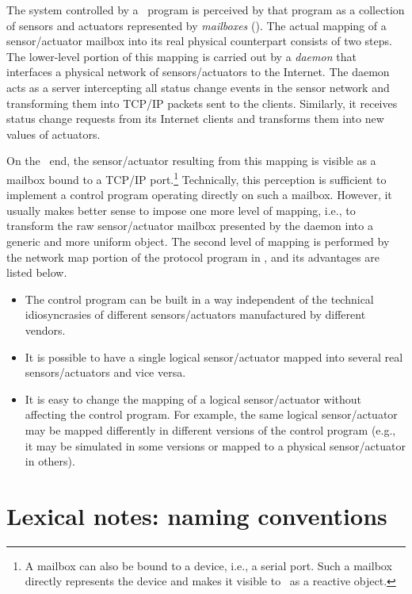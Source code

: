 The system controlled by a \smurph\ program is perceived by that program
as a collection of sensors and actuators represented by
{\em mailboxes\/} ().
The actual mapping of a sensor/actuator mailbox into its real physical
counterpart consists of two steps.
The lower-level portion of this mapping is carried out by a {\em daemon\/} that
interfaces a physical network of sensors/actuators to the Internet.
The daemon acts as a server
intercepting all status change events in the sensor network and transforming
them into TCP/IP packets sent to the clients.
Similarly, it receives status change requests from its Internet
clients and transforms them into new values of actuators.

On the \smurph\ end, the sensor/actuator resulting from this mapping is
visible as a mailbox bound to a TCP/IP
port.\footnote{A mailbox can also be bound to a device, i.e., a serial
port.
Such a mailbox directly represents the device and makes it visible
to \smurph\ as a reactive object.}
Technically, this perception is sufficient to implement a control program
operating directly on such a mailbox.
However, it usually makes better sense to impose one more level of mapping,
i.e., to transform the raw sensor/actuator mailbox presented by the
daemon into a generic and more uniform object.
The second level of mapping is performed by the network map portion of the
protocol program in {\smurph}, and its advantages are listed below.

\begin{itemize}
\item
The control program can be built in a way independent of the technical
idiosyncrasies of different sensors/actuators manufactured by
different vendors.
\item
It is possible to have a single logical sensor/actuator mapped into several
real sensors/actuators and vice versa.
\item
It is easy to change the mapping of a logical sensor/actuator without affecting
the control program.
For example,
the same logical sensor/actuator may be mapped differently
in different versions of the control program (e.g., it may be simulated
in some versions or mapped to a physical sensor/actuator in others).
\end{itemize}

\section {Lexical notes: naming conventions}
\label{rm_ln}


